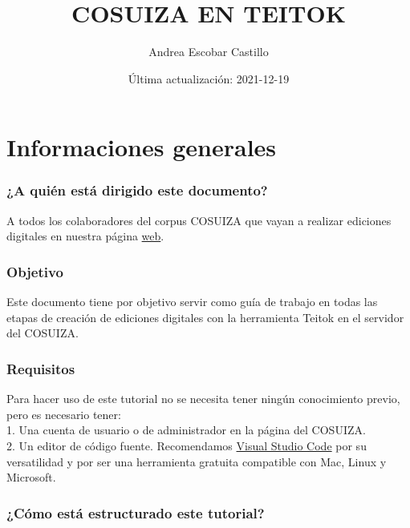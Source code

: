 \documentclass[
]{book}
\title{COSUIZA EN TEITOK}
\author{Andrea Escobar Castillo}
\date{Última actualización: 2021-12-19}
\begin{document}
\maketitle

{
\setcounter{tocdepth}{1}
\tableofcontents
}
\hypertarget{informaciones-generales}{%
\chapter*{Informaciones generales}\label{informaciones-generales}}

\hypertarget{a-quiuxe9n-estuxe1-dirigido-este-documento}{%
\subsection*{¿A quién está dirigido este documento?}\label{a-quiuxe9n-estuxe1-dirigido-este-documento}}

A todos los colaboradores del corpus COSUIZA que vayan a realizar ediciones digitales en nuestra página \href{https://cosuiza.unil.ch/}{web}.

\hypertarget{objetivo}{%
\subsection*{Objetivo}\label{objetivo}}

Este documento tiene por objetivo servir como guía de trabajo en todas las etapas de creación de ediciones digitales con la herramienta Teitok en el servidor del COSUIZA.

\hypertarget{requisitos}{%
\subsection*{Requisitos}\label{requisitos}}

Para hacer uso de este tutorial no se necesita tener ningún conocimiento previo, pero es necesario tener:\\
1. Una cuenta de usuario o de administrador en la página del COSUIZA.\\
2. Un editor de código fuente. Recomendamos \href{https://code.visualstudio.com/}{Visual Studio Code} por su versatilidad y por ser una herramienta gratuita compatible con Mac, Linux y Microsoft.

\hypertarget{cuxf3mo-estuxe1-estructurado-este-tutorial}{%
\subsection*{¿Cómo está estructurado este tutorial?}\label{cuxf3mo-estuxe1-estructurado-este-tutorial}}
\end{document}
